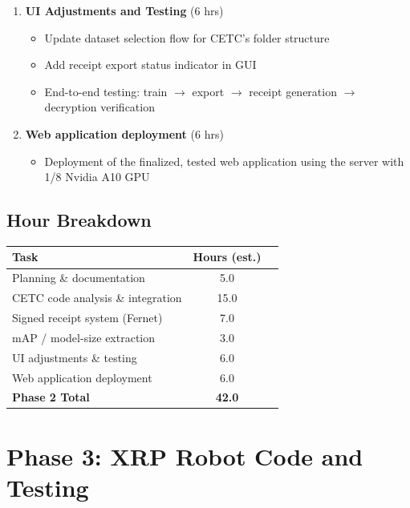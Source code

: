 \documentclass[a4]{article}
\begin{document}
\begin{enumerate}[leftmargin=*]
    \item \textbf{UI Adjustments and Testing} (6 hrs)
    \begin{itemize}
        \item Update dataset selection flow for CETC's folder structure
        \item Add receipt export status indicator in GUI
        \item End-to-end testing: train $\rightarrow$ export $\rightarrow$ receipt generation $\rightarrow$ decryption verification
    \end{itemize}
    \item \textbf{Web application deployment} (6 hrs)
    \begin{itemize}
        \item Deployment of the finalized, tested web application using the server with 1/8 Nvidia A10 GPU
    \end{itemize}
\end{enumerate}

\subsection*{Hour Breakdown}

\begin{center}
\begin{tabular}{lcc}
\toprule
\textbf{Task} & \textbf{Hours (est.)} \\
\midrule
Planning \& documentation & 5.0  \\
CETC code analysis \& integration & 15.0  \\
Signed receipt system (Fernet) & 7.0  \\
mAP / model-size extraction & 3.0  \\
UI adjustments \& testing & 6.0  \\
Web application deployment & 6.0  \\
\midrule
\textbf{Phase 2 Total} & \textbf{42.0}  \\
\bottomrule
\end{tabular}
\end{center}

\section*{Phase 3: XRP Robot Code and Testing}
\end{document}
